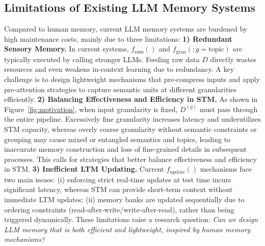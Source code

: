

\subsection{Limitations of Existing LLM Memory Systems}

Compared to human memory, current LLM memory systems are burdened by high maintenance costs, mainly due to three limitations:  
\textbf{1) Redundant Sensory Memory.} In current systems, $f_{\text{sum}}()$ and $f_{\text{gran}}(; g=\text{topic})$ are typically executed by calling stronger LLMs. 
Feeding raw data $D$ directly wastes resources and even weakens in-context learning due to redundancy. 
A key challenge is to design lightweight mechanisms that pre-compress inputs and apply pre-attention strategies to capture semantic units at different granularities efficiently.  
\textbf{2) Balancing Effectiveness and Efficiency in STM.} 
As shown in Figure~\ref{fig:motivation}, when input granularity is fixed, $D^{(g)}$ must pass through the entire pipeline. 
Excessively fine granularity increases latency and underutilizes STM capacity, whereas overly coarse granularity without semantic constraints or grouping may cause mixed or entangled semantics and topics, leading to inaccurate memory construction and loss of fine-grained details in subsequent processes. 
This calls for strategies that better balance effectiveness and efficiency in STM.  
\textbf{3) Inefficient LTM Updating.} 
Current $f_{\text{update}}()$ mechanisms face two main issues: (i) enforcing strict real-time updates at test time incurs significant latency, whereas STM can provide short-term context without immediate LTM updates; (ii) memory banks are updated sequentially due to ordering constraints (read-after-write/write-after-read), rather than being triggered dynamically. 
These limitations raise a research question: \emph{Can we design LLM memory that is both efficient and lightweight, inspired by human memory mechanisms?}



